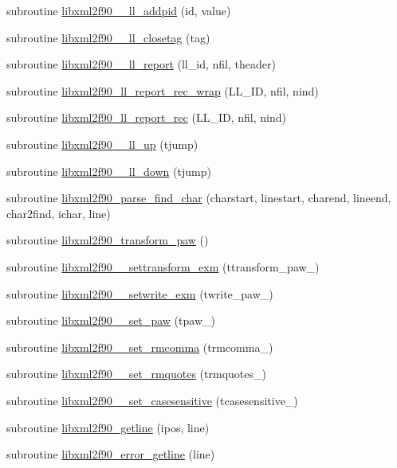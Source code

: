 \begin{DoxyCompactItemize}
subroutine \hyperlink{libxml2f90_8f90__pp_8f90_a27b88f71526165bff7aec413fad71028}{libxml2f90\+\_\+\+\_\+ll\+\_\+addpid} (id, value)
\item 
subroutine \hyperlink{libxml2f90_8f90__pp_8f90_afd5fe490d70aae05e74fd17e87d31431}{libxml2f90\+\_\+\+\_\+ll\+\_\+closetag} (tag)
\item 
subroutine \hyperlink{libxml2f90_8f90__pp_8f90_a82abdf47d88bfca1f54ddd7fb0ca71f2}{libxml2f90\+\_\+\+\_\+ll\+\_\+report} (ll\+\_\+id, nfil, theader)
\item 
subroutine \hyperlink{libxml2f90_8f90__pp_8f90_aab03f23626a21bebdc849515ddbb2a84}{libxml2f90\+\_\+ll\+\_\+report\+\_\+rec\+\_\+wrap} (L\+L\+\_\+\+ID, nfil, nind)
\item 
subroutine \hyperlink{libxml2f90_8f90__pp_8f90_a5ddfde66a72fddf024606b83f50ecc3a}{libxml2f90\+\_\+ll\+\_\+report\+\_\+rec} (L\+L\+\_\+\+ID, nfil, nind)
\item 
subroutine \hyperlink{libxml2f90_8f90__pp_8f90_a4fdb16cf1b5c9a1b391a00dc270c835f}{libxml2f90\+\_\+\+\_\+ll\+\_\+up} (tjump)
\item 
subroutine \hyperlink{libxml2f90_8f90__pp_8f90_abe93b7544a083264c1c567ae64b7afa1}{libxml2f90\+\_\+\+\_\+ll\+\_\+down} (tjump)
\item 
subroutine \hyperlink{libxml2f90_8f90__pp_8f90_af6b4f4c6b9bd06993e7ab5cb607e7228}{libxml2f90\+\_\+parse\+\_\+find\+\_\+char} (charstart, linestart, charend, lineend, char2find, ichar, line)
\item 
subroutine \hyperlink{libxml2f90_8f90__pp_8f90_abf51b9d401b7210767c8a771a9ba2cf4}{libxml2f90\+\_\+transform\+\_\+paw} ()
\item 
subroutine \hyperlink{libxml2f90_8f90__pp_8f90_a2a5163c07b4567f5db11625bcdbb7607}{libxml2f90\+\_\+\+\_\+settransform\+\_\+exm} (ttransform\+\_\+paw\+\_\+)
\item 
subroutine \hyperlink{libxml2f90_8f90__pp_8f90_aa478c761a45bbb0eafdd081ea6cc0694}{libxml2f90\+\_\+\+\_\+setwrite\+\_\+exm} (twrite\+\_\+paw\+\_\+)
\item 
subroutine \hyperlink{libxml2f90_8f90__pp_8f90_ac3295351747cc53a1b37a87e4f99449d}{libxml2f90\+\_\+\+\_\+set\+\_\+paw} (tpaw\+\_\+)
\item 
subroutine \hyperlink{libxml2f90_8f90__pp_8f90_a853486e07f72af447dd5879e95f96c8d}{libxml2f90\+\_\+\+\_\+set\+\_\+rmcomma} (trmcomma\+\_\+)
\item 
subroutine \hyperlink{libxml2f90_8f90__pp_8f90_a88da78fbb7daa3d56763c5fe13fe2b35}{libxml2f90\+\_\+\+\_\+set\+\_\+rmquotes} (trmquotes\+\_\+)
\item 
subroutine \hyperlink{libxml2f90_8f90__pp_8f90_a97c04842d1625e96827c3d32280408ec}{libxml2f90\+\_\+\+\_\+set\+\_\+casesensitive} (tcasesensitive\+\_\+)
\item 
subroutine \hyperlink{libxml2f90_8f90__pp_8f90_abef5a4be7710d60ad11aab5a59fe5325}{libxml2f90\+\_\+getline} (ipos, line)
\item 
subroutine \hyperlink{libxml2f90_8f90__pp_8f90_ae1a542a061a5705a796b5373b0dcaf1b}{libxml2f90\+\_\+error\+\_\+getline} (line)
\end{DoxyCompactItemize}
